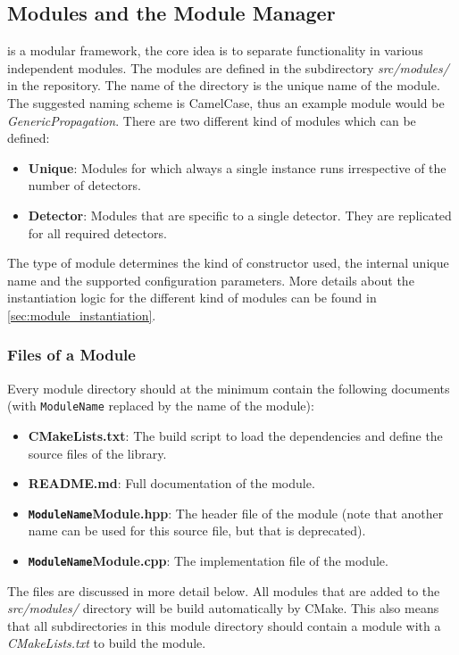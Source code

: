 \subsection{Modules and the Module Manager}
\label{sec:module_manager}
\apsq is a modular framework, the core idea is to separate functionality in various independent modules. The modules are defined in the subdirectory \textit{src/modules/} in the repository. The name of the directory is the unique name of the module. The suggested naming scheme is CamelCase, thus an example module would be \textit{GenericPropagation}. There are two different kind of modules which can be defined:
\begin{itemize}
\item \textbf{Unique}: Modules for which always a single instance runs irrespective of the number of detectors.
\item \textbf{Detector}: Modules that are specific to a single detector. They are replicated for all required detectors.
\end{itemize}
The type of module determines the kind of constructor used, the internal unique name and the supported configuration parameters. More details about the instantiation logic for the different kind of modules can be found in \ref{sec:module_instantiation}.

\subsubsection{Files of a Module}
\label{sec:module_files}
Every module directory should at the minimum contain the following documents (with \texttt{ModuleName} replaced by the name of the module):
\begin{itemize}
\item \textbf{CMakeLists.txt}: The build script to load the dependencies and define the source files of the library.
\item \textbf{README.md}: Full documentation of the module.
\item \textbf{\texttt{ModuleName}Module.hpp}: The header file of the module (note that another name can be used for this source file, but that is deprecated).
\item \textbf{\texttt{ModuleName}Module.cpp}: The implementation file of the module.
\end{itemize}
The files are discussed in more detail below. All modules that are added to the \textit{src/modules/} directory will be build automatically by CMake. This also means that all subdirectories in this module directory should contain a module with a \textit{CMakeLists.txt} to build the module.

